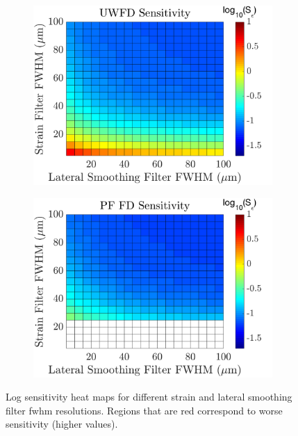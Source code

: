 \begin{figure}[h!]
\begin{subfigure}{0.49\textwidth}
        	\includegraphics[width=\textwidth]{appendix_figs/uwfd_sensitivity.png}
	\end{subfigure}
	\begin{subfigure}{0.49\textwidth}
    		\centering
	        \includegraphics[width=\textwidth]{appendix_figs/pffd_sensitivity.png}
    	\end{subfigure}
    	\caption{Log sensitivity heat maps for different strain and lateral smoothing filter \ac{fwhm} resolutions. Regions that are red correspond to worse sensitivity (higher values).}
	\label{sensitivity_heatmaps}	
\end{figure}

